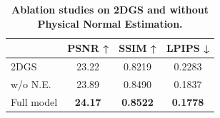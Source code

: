 \begin{table}[t]
\centering
\small
\caption{\textbf{Ablation studies on 2DGS and without Physical Normal Estimation.}}
\label{tab:ablation_2dgs}
\vspace{-2mm}
\begin{tabular}{lccc}
    \toprule
      & PSNR ↑ & SSIM ↑ & LPIPS ↓ \\
    \midrule
    2DGS~\citep{huang20242d} &23.22  &0.8219  &0.2283  \\
    w/o N.E. &23.89  &0.8490  &0.1837  \\
    Full model &\textbf{24.17}  &\textbf{0.8522}  &\textbf{0.1778}  \\
    \bottomrule
\end{tabular}
\end{table}